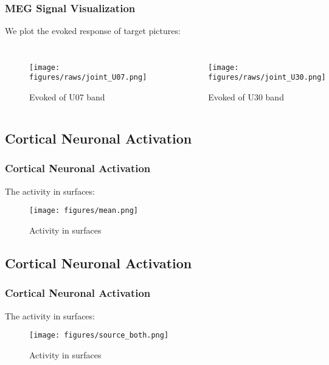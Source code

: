 \documentclass[aspectratio=169]{beamer}
\begin{document}
\begin{frame}
    \frametitle{MEG Signal Visualization}
    We plot the evoked response of target pictures:

    \begin{columns}

        \begin{figure}[h]
            \centering
            \texttt{[image: figures/raws/joint\_U07.png]}
            \caption{Evoked of U07 band}
        \end{figure}


        \begin{figure}[!h]
            \centering
            \texttt{[image: figures/raws/joint\_U30.png]}
            \caption{Evoked of U30 band}
        \end{figure}

    \end{columns}

\end{frame}

\subsection{Cortical Neuronal Activation}

\begin{frame}
    \frametitle{Cortical Neuronal Activation}
    The activity in surfaces:

    \begin{figure}[h]
        \centering
        \texttt{[image: figures/mean.png]}
        \caption{Activity in surfaces}
    \end{figure}

\end{frame}

\subsection{Cortical Neuronal Activation}

\begin{frame}
    \frametitle{Cortical Neuronal Activation}
    The activity in surfaces:

    \begin{figure}[h]
        \centering
        \texttt{[image: figures/source\_both.png]}
        \caption{Activity in surfaces}
    \end{figure}

\end{frame}
\end{document}
